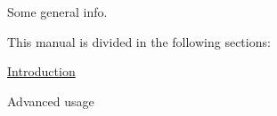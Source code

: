 Some general info.

This manual is divided in the following sections\-:
\begin{DoxyItemize}
\item \hyperlink{intro}{Introduction}
\item Advanced usage 
\end{DoxyItemize}